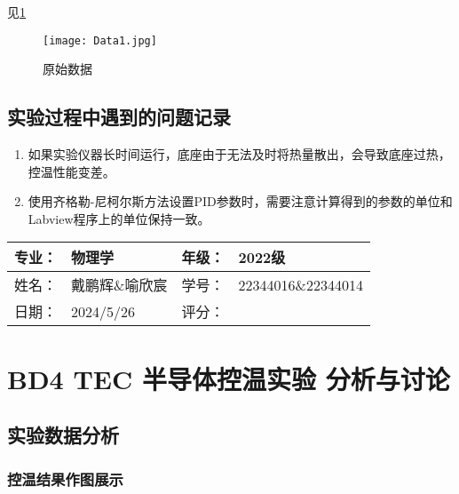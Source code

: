 \documentclass[dvipsnames, svgnames,a4paper,11pt]{article}
\begin{document}
	见\cref{fig:data}

	\begin{figure}[htbp]
		\centering
		{\texttt{[image: Data1.jpg]}\label{fig:data1}}
		\quad

		\caption{原始数据}
		\label{fig:data}
	\end{figure}




\subsection{实验过程中遇到的问题记录}


\begin{enumerate}
	\item 如果实验仪器长时间运行，底座由于无法及时将热量散出，会导致底座过热，控温性能变差。
	\item 使用齐格勒-尼柯尔斯方法设置PID参数时，需要注意计算得到的参数的单位和Labview程序上的单位保持一致。
\end{enumerate}
	





\clearpage
\begin{table}
	\renewcommand\arraystretch{1.7}
	\begin{tabularx}{\textwidth}{|X|X|X|X|}
	\hline
	专业：& 物理学 &年级：& 2022级\\
	\hline
	姓名： & 戴鹏辉\&喻欣宸 & 学号：& 22344016\&22344014\\
	\hline
    日期：& 2024/5/26 & 评分： &\\
	\hline
	\end{tabularx}
\end{table}

\section{BD4 \quad TEC 半导体控温实验 \quad\heiti 分析与讨论}

\subsection{实验数据分析}


\subsubsection{控温结果作图展示}
    
\end{document}
